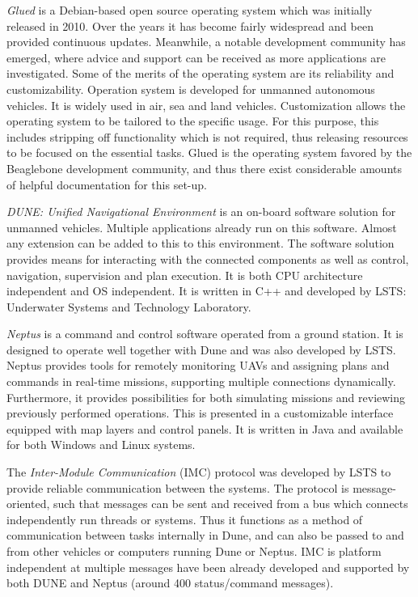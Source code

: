 \textit{Glued} is a Debian-based open source operating system which was initially released in 2010.  Over the years it has become fairly widespread and been provided continuous updates.  Meanwhile, a notable development community has emerged, where advice and support can be received as more applications are investigated. Some of the merits of the operating system are its reliability and customizability. Operation system is developed for unmanned autonomous vehicles. It is widely used in air, sea and land vehicles. Customization allows the operating system to be tailored to the specific usage. For this purpose, this includes stripping off functionality which is not required, thus releasing resources to be focused on the essential tasks. Glued is the operating system favored by the Beaglebone development community, and thus there exist considerable amounts of helpful documentation for this set-up.

\textit{DUNE: Unified Navigational Environment} is an on-board software solution for unmanned vehicles. Multiple applications already run on this software. Almost any extension can be added to this to this environment. The software solution provides means for interacting with the connected components as well as control, navigation, supervision and plan execution.  It is both CPU architecture independent and OS independent.  It is written in C++ and developed by LSTS: Underwater Systems and Technology Laboratory.

\textit{Neptus} \cite{pinto2006neptus,dias2006mission,dias2005neptus} is a command and control software operated from a ground station. It is designed to operate well together with Dune and was also developed by LSTS. Neptus provides tools for remotely monitoring UAVs and assigning plans and commands in real-time missions, supporting multiple connections dynamically. Furthermore, it provides possibilities for both simulating missions and reviewing previously performed operations. This is presented in a customizable interface equipped with map layers and control panels. It is written in Java and available for both Windows and Linux systems.

The \textit{Inter-Module Communication} \cite{martins2009imc} (IMC) protocol was developed by LSTS to provide reliable communication between the systems.  The protocol is message-oriented, such that messages can be sent and received from a bus which connects independently run threads or systems.  Thus it functions as a method of communication between tasks internally in Dune, and can also be passed to and from other vehicles or computers running Dune or Neptus.  IMC is platform independent at multiple messages have been already developed and supported by both DUNE and Neptus (around 400 status/command messages).

